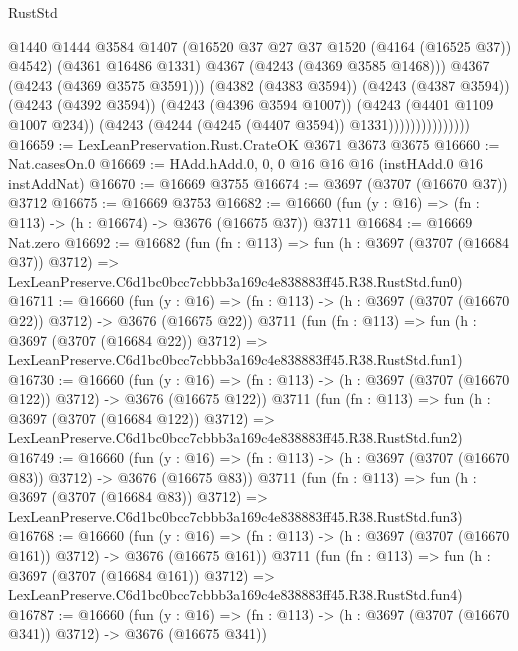 \begin{lexlean}{RustStd}
\begin{coremodule}
                                  @1440
                                  @1444
                                  @3584
                                  @1407
                                  (@16520 @37 @27 @37 @1520 (@4164 (@16525 @37)) @4542)
                                  (@4361 @16486 @1331)
                                  @4367
                                  (@4243 (@4369 @3585 @1468)))
                                @4367
                                (@4243 (@4369 @3575 @3591)))
                              (@4382 (@4383 @3594))
                              (@4243 (@4387 @3594))
                              (@4243 (@4392 @3594))
                              (@4243 (@4396 @3594 @1007))
                              (@4243 (@4401 @1109 @1007 @234))
                              (@4243 (@4244 (@4245 (@4407 @3594)) @1331)))))))))))))))
@16659 := LexLeanPreservation.Rust.CrateOK @3671 @3673 @3675
@16660 := Nat.casesOn.{0}
@16669 := HAdd.hAdd.{0, 0, 0} @16 @16 @16 (instHAdd.{0} @16 instAddNat)
@16670 := @16669 @3755
@16674 := @3697 (@3707 (@16670 @37)) @3712
@16675 := @16669 @3753
@16682 := @16660 (fun (y : @16) => (fn : @113) -> (h : @16674) -> @3676 (@16675 @37)) @3711
@16684 := @16669 Nat.zero
@16692 := @16682
    (fun (fn : @113) =>
    fun (h : @3697 (@3707 (@16684 @37)) @3712) =>
    LexLeanPreserve.C6d1bc0bcc7cbbb3a169c4e838883ff45.R38.RustStd.fun0)
@16711 := @16660
    (fun (y : @16) => (fn : @113) -> (h : @3697 (@3707 (@16670 @22)) @3712) -> @3676 (@16675 @22))
    @3711
    (fun (fn : @113) =>
    fun (h : @3697 (@3707 (@16684 @22)) @3712) =>
    LexLeanPreserve.C6d1bc0bcc7cbbb3a169c4e838883ff45.R38.RustStd.fun1)
@16730 := @16660
    (fun (y : @16) => (fn : @113) -> (h : @3697 (@3707 (@16670 @122)) @3712) -> @3676 (@16675 @122))
    @3711
    (fun (fn : @113) =>
    fun (h : @3697 (@3707 (@16684 @122)) @3712) =>
    LexLeanPreserve.C6d1bc0bcc7cbbb3a169c4e838883ff45.R38.RustStd.fun2)
@16749 := @16660
    (fun (y : @16) => (fn : @113) -> (h : @3697 (@3707 (@16670 @83)) @3712) -> @3676 (@16675 @83))
    @3711
    (fun (fn : @113) =>
    fun (h : @3697 (@3707 (@16684 @83)) @3712) =>
    LexLeanPreserve.C6d1bc0bcc7cbbb3a169c4e838883ff45.R38.RustStd.fun3)
@16768 := @16660
    (fun (y : @16) => (fn : @113) -> (h : @3697 (@3707 (@16670 @161)) @3712) -> @3676 (@16675 @161))
    @3711
    (fun (fn : @113) =>
    fun (h : @3697 (@3707 (@16684 @161)) @3712) =>
    LexLeanPreserve.C6d1bc0bcc7cbbb3a169c4e838883ff45.R38.RustStd.fun4)
@16787 := @16660
    (fun (y : @16) => (fn : @113) -> (h : @3697 (@3707 (@16670 @341)) @3712) -> @3676 (@16675 @341))

\end{coremodule}
\end{lexlean}
